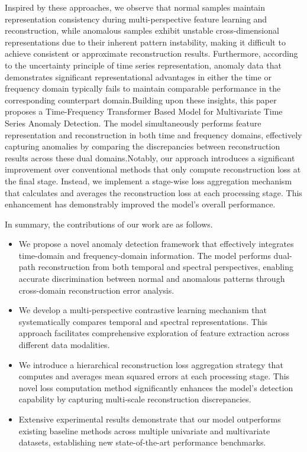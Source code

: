 \documentclass[sigconf]{acmart}
\begin{document}
Inspired by these approaches, we observe that normal samples maintain representation 
consistency during multi-perspective feature learning and reconstruction, 
while anomalous samples exhibit unstable cross-dimensional representations due to 
their inherent pattern instability, making it difficult to achieve consistent or 
approximate reconstruction results. Furthermore, according to the uncertainty principle 
of time series representation, anomaly data that demonstrates significant representational 
advantages in either the time or frequency domain typically fails to maintain comparable 
performance in the corresponding counterpart domain.Building upon these insights, 
this paper proposes a Time-Frequency Transformer Based Model for Multivariate Time Series Anomaly Detection. 
The model simultaneously performs feature representation and reconstruction in both 
time and frequency domains, effectively capturing anomalies by comparing the discrepancies between 
reconstruction results across these dual domains.Notably, our approach introduces 
a significant improvement over conventional methods that only compute reconstruction loss 
at the final stage. Instead, we implement a stage-wise loss aggregation mechanism that 
calculates and averages the reconstruction loss at each processing stage. This enhancement 
has demonstrably improved the model's overall performance.

In summary, the contributions of our work are as follows.
\begin{itemize}
\item We propose a novel anomaly detection framework that effectively integrates 
time-domain and frequency-domain information. The model performs dual-path reconstruction 
from both temporal and spectral perspectives, enabling accurate discrimination between 
normal and anomalous patterns through cross-domain reconstruction error analysis.
\item We develop a multi-perspective contrastive learning mechanism that systematically 
compares temporal and spectral representations. This approach facilitates comprehensive 
exploration of feature extraction across different data modalities.
\item We introduce a hierarchical reconstruction loss aggregation strategy that computes 
and averages mean squared errors at each processing stage. This novel loss computation 
method significantly enhances the model's detection capability by capturing multi-scale reconstruction discrepancies.
\item Extensive experimental results demonstrate that our model outperforms existing 
baseline methods across multiple univariate and multivariate datasets, establishing 
new state-of-the-art performance benchmarks.
\end{itemize}
\end{document}

